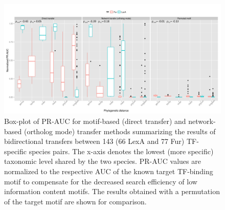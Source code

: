 \begin{figure}
  \centering
  \includegraphics[width=\textwidth]{figures/chapter3/phylogenetic-distance}
  \caption{Box-plot of PR-AUC for motif-based (direct transfer) and
    network-based (ortholog mode) transfer methods summarizing the results of
    bidirectional transfers between 143 (66 LexA and 77 Fur) TF-specific
    species pairs. The x-axis denotes the lowest (more specific) taxonomic
    level shared by the two species. PR-AUC values are normalized to the
    respective AUC of the known target TF-binding motif to compensate for the
    decreased search efficiency of low information content motifs. The results
    obtained with a permutation of the target motif are shown for comparison.}
\label{fig:phylogenetic-distance}
\end{figure}

